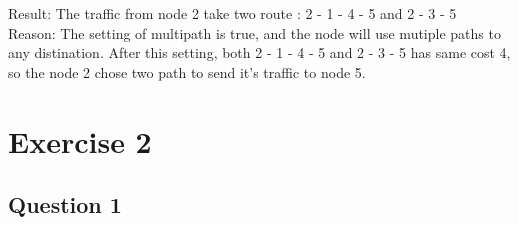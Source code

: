 \documentclass{article}
\begin{document}
Result: The traffic from node 2 take two route : 2 - 1 - 4 - 5 and 2 - 3 - 5 \\
Reason: The setting of multipath is true, and the node will use mutiple paths to any distination. After this setting, both 2 - 1 - 4 - 5 and 2 - 3 - 5 has same cost 4, so the node 2 chose two path to send it's traffic to node 5.

\section{Exercise 2}

\subsection{Question 1}
\end{document}
